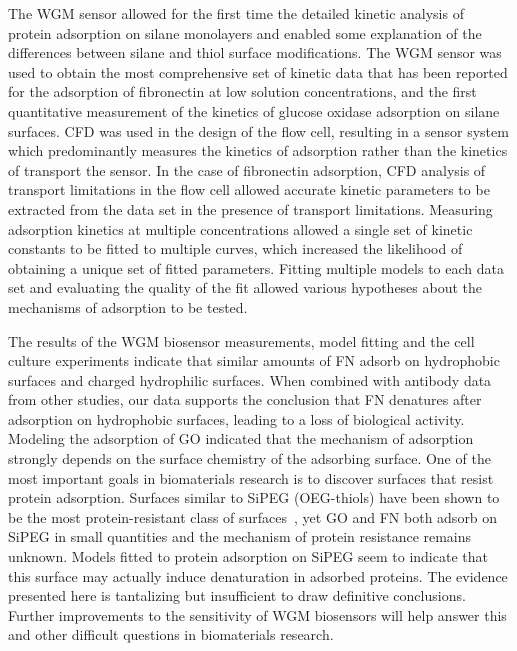 The WGM sensor allowed for the first time the detailed kinetic analysis
of protein adsorption on silane monolayers and enabled some explanation
of the differences between silane and thiol surface modifications.
The WGM sensor was used to obtain the most comprehensive set of kinetic
data that has been reported for the adsorption of fibronectin at low
solution concentrations, and the first quantitative measurement of
the kinetics of glucose oxidase adsorption on silane surfaces. CFD
was used in the design of the flow cell, resulting in a sensor system
which predominantly measures the kinetics of adsorption rather than
the kinetics of transport the sensor. In the case of fibronectin adsorption,
CFD analysis of transport limitations in the flow cell allowed accurate
kinetic parameters to be extracted from the data set in the presence
of transport limitations. Measuring adsorption kinetics at multiple
concentrations allowed a single set of kinetic constants to be fitted
to multiple curves, which increased the likelihood of obtaining a
unique set of fitted parameters. Fitting multiple models to each data
set and evaluating the quality of the fit allowed various hypotheses
about the mechanisms of adsorption to be tested.

The results of the WGM biosensor measurements, model fitting and the
cell culture experiments indicate that similar amounts of FN adsorb
on hydrophobic surfaces and charged hydrophilic surfaces. When combined
with antibody data from other studies, our data supports the conclusion
that FN denatures after adsorption on hydrophobic surfaces, leading
to a loss of biological activity. Modeling the adsorption of GO indicated
that the mechanism of adsorption strongly depends on the surface chemistry
of the adsorbing surface. One of the most important goals in biomaterials
research is to discover surfaces that resist protein adsorption. Surfaces
similar to SiPEG (OEG-thiols) have been shown to be the most protein-resistant
class of surfaces~\cite{Ostuni2001}, yet GO and FN both adsorb on
SiPEG in small quantities and the mechanism of protein resistance
remains unknown. Models fitted to protein adsorption on SiPEG seem
to indicate that this surface may actually induce denaturation in
adsorbed proteins. The evidence presented here is tantalizing but
insufficient to draw definitive conclusions. Further improvements
to the sensitivity of WGM biosensors will help answer this and other
difficult questions in biomaterials research.


